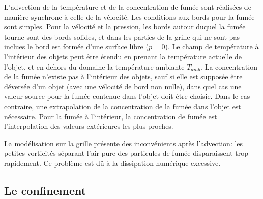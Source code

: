 \documentclass[11pt]{article}
\begin{document}
L'advection de la température et de la concentration de fumée sont réalisées de manière synchrone à celle de la vélocité.\newline
Les conditions aux bords pour la fumée sont simples. Pour la vélocité et la pression, les bords autour duquel la fumée tourne sont des bords solides, et dans les parties de la grille qui ne sont pas inclues le bord est formée d'une surface libre ($p=0$). Le champ de température à l'intérieur des objets peut être étendu en prenant la température actuelle de l'objet, et en dehors du domaine la température ambiante $T_{amb}$. La concentration de la fumée n'existe pas à l'intérieur des objets, sauf si elle est supposée être déversée d'un objet (avec une vélocité de bord non nulle), dans quel cas une valeur source pour la fumée contenue dans l'objet doit être choisie. Dans le cas contraire, une extrapolation de la concentration de la fumée dans l'objet est nécessaire. Pour la fumée à l'intérieur, la concentration de fumée est l'interpolation des valeurs extérieures les plus proches.\newline

La modélisation sur la grille présente des inconvénients après l'advection: les petites vorticités séparant l'air pure des particules de fumée disparaissent trop rapidement. Ce problème est dû à la dissipation numérique excessive.

\subsection{Le confinement}
\end{document}

